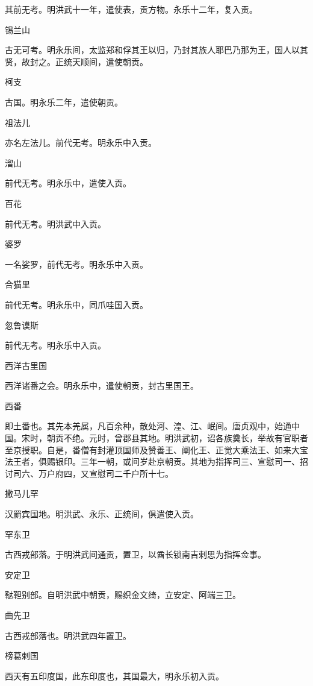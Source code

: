 \documentclass[a4paper,12pt,UTF8,twoside]{ctexbook}
\begin{document}
    其前无考。明洪武十一年，遣使表，贡方物。永乐十二年，复入贡。
    
    锡兰山
    
    古无可考。明永乐间，太监郑和俘其王以归，乃封其族人耶巴乃那为王，国人以其贤，故封之。正统天顺间，遣使朝贡。
    
    柯支
    
    古国。明永乐二年，遣使朝贡。
    
    祖法儿
    
    亦名左法儿。前代无考。明永乐中入贡。
    
    溜山
    
    前代无考。明永乐中，遣使入贡。
    
    百花
    
    前代无考。明洪武中入贡。
    
    婆罗
    
    一名娑罗，前代无考。明永乐中入贡。
    
    合猫里
    
    前代无考。明永乐中，同爪哇国入贡。
    
    忽鲁谟斯
    
    前代无考。明永乐中入贡。
    
    西洋古里国
    
    西洋诸番之会。明永乐中，遣使朝贡，封古里国王。
    
    西番
    
    即土番也。其先本羌属，凡百余种，散处河、湟、江、岷间。唐贞观中，始通中国。宋时，朝贡不绝。元时，曾郡县其地。明洪武初，诏各族奠长，举故有官职者至京授职。自是，番僧有封灌顶国师及赞善王、阐化王、正觉大乘法王、如来大宝法王者，俱赐银印。三年一朝，或间岁赴京朝贡。其地为指挥司三、宣慰司一、招讨司六、万户府四，又宣慰司二千户所十七。
    
    撒马儿罕
    
    汉罽宾国地。明洪武、永乐、正统间，俱遣使入贡。
    
    罕东卫
    
    古西戎部落。于明洪武间通贡，置卫，以酋长锁南吉剌思为指挥佥事。
    
    安定卫
    
    鞑靼别部。自明洪武中朝贡，赐织金文绮，立安定、阿端三卫。
    
    曲先卫
    
    古西戎部落也。明洪武四年置卫。
    
    榜葛剌国
    
    西天有五印度国，此东印度也，其国最大，明永乐初入贡。
    
\end{document}
